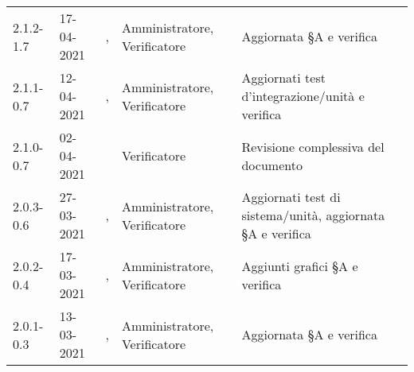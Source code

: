 {\begin{longtable}{C{1.7cm} | C{2.5cm} | C{3.2cm} | C{2.9cm} | C{4.6cm}}
2.1.2-1.7 & 17-04-2021 & \SP{}, \BM{} & Amministratore, Verificatore & Aggiornata \S A e verifica\\

2.1.1-0.7 & 12-04-2021 & \SP{}, \BM{} & Amministratore, Verificatore & Aggiornati test d'integrazione/unità e verifica\\

2.1.0-0.7 & 02-04-2021 & \RA{} & Verificatore & Revisione complessiva del documento \\

2.0.3-0.6 & 27-03-2021 & \PA{}, \ZM{} & Amministratore, Verificatore & Aggiornati test di sistema/unità, aggiornata \S A e verifica\\

2.0.2-0.4 & 17-03-2021 & \SP{}, \SG{} & Amministratore, Verificatore & Aggiunti grafici \S A e verifica\\

2.0.1-0.3 & 13-03-2021 & \SP{}, \SG{} & Amministratore, Verificatore & Aggiornata \S A e verifica\\


\end{longtable}}
